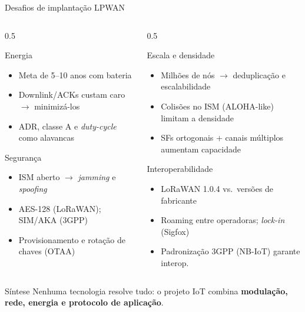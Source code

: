 \documentclass[aspectratio=169,11pt]{beamer}
\begin{document}
\begin{frame}{Desafios de implantação LPWAN}
  \footnotesize
  \begin{columns}[t]
    \begin{column}{0.5\textwidth}
      \begin{block}{Energia}
        \begin{itemize}
          \item Meta de 5--10 anos com bateria
          \item Downlink/ACKs custam caro $\rightarrow$ minimizá-los
          \item ADR, classe A e \emph{duty-cycle} como alavancas
        \end{itemize}
      \end{block}
      \begin{block}{Segurança}
        \begin{itemize}
          \item ISM aberto $\rightarrow$ \emph{jamming} e \emph{spoofing}
          \item AES-128 (LoRaWAN); SIM/AKA (3GPP)
          \item Provisionamento e rotação de chaves (OTAA)
        \end{itemize}
      \end{block}
    \end{column}
    \begin{column}{0.5\textwidth}
      \begin{block}{Escala e densidade}
        \begin{itemize}
          \item Milhões de nós $\rightarrow$ deduplicação e escalabilidade
          \item Colisões no ISM (ALOHA-like) limitam a densidade
          \item SFs ortogonais + canais múltiplos aumentam capacidade
        \end{itemize}
      \end{block}
      \begin{block}{Interoperabilidade}
        \begin{itemize}
          \item LoRaWAN 1.0.4 vs.\ versões de fabricante
          \item Roaming entre operadoras; \emph{lock-in} (Sigfox)
          \item Padronização 3GPP (NB-IoT) garante interop.
        \end{itemize}
      \end{block}
    \end{column}
  \end{columns}
  \pause
  \begin{exampleblock}{Síntese}
    Nenhuma tecnologia resolve tudo: o projeto IoT combina \textbf{modulação, rede, energia e protocolo de aplicação}.
  \end{exampleblock}
\end{frame}
\end{document}
